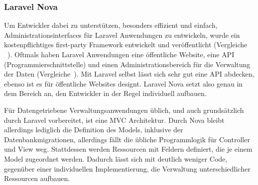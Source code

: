 \subsubsection{Laravel Nova}
Um Entwickler dabei zu unterstützen, besonders effizient und einfach, Administrationsinterfaces für Laravel Anwendungen zu entwickeln, wurde ein kostenpflichtiges first-party Framework entwickelt und veröffentlicht (Vergleiche ~\cite{laravel-nova}).
Oftmals haben Laravel Anwendungen eine öffentliche Website, eine API (Programmierschnittstelle) und einen Administrationsbereich für die Verwaltung der Daten (Vergleiche~\cite{laravel-up-and-running}).
Mit Laravel selbst lässt sich sehr gut eine API abdecken, ebenso ist es für öffentliche Websites designt.
Laravel Nova setzt also genau in dem Bereich an, den Entwickler in der Regel individuell aufbauen.

Für Datengetriebene Verwaltungsanwendungen üblich, und auch grundsätzlich durch Laravel vorbereitet, ist eine MVC Architektur.
Durch Nova bleibt allerdings lediglich die Definition des Models, inklusive der Datenbankmigrationen, allerdings fällt die übliche Programmlogik für Controller und View weg.
Stattdessen werden Ressourcen mit Feldern definiert, die je einem Model zugeordnet werden.
Dadurch lässt sich mit deutlich weniger Code, gegenüber einer individuellen Implementierung, die Verwaltung unterschiedlicher Ressourcen aufbauen.
